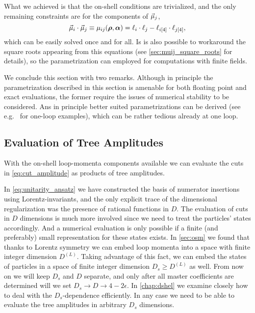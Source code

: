 What we achieved is that the on-shell conditions are trivialized,
and the only remaining constraints are for the components of $\va{\mu}_j$,
\begin{equation}
  \va{\mu}_i \cdot \va{\mu}_j  \equiv  \mu_{ij} (\vb*{\rho},\vb*{\alpha}) = \ell_i\cdot \ell_j - \ell_{i[4]}\cdot \ell_{j[4]},
\end{equation}
which can be easily solved once and for all.
Is is also possible to workaround the square roots appearing from this equations (see \cref{sec:muij_square_roots} for details),
so the parametrization can employed for computations with finite fields.

We conclude this section with two remarks.
Although in principle the parametrization described in this
section is amenable for both floating point and exact evaluations,
the former require the issues of numerical stability to be considered.
Ans in principle better suited parametrizations can be derived (see e.g.\ \cite{Kilgore:2007qr,Berger:2008sj} for one-loop examples),
which can be rather tedious already at one loop.

\subsection{Evaluation of Tree Amplitudes}
\label{sec:evaluation_of_tree_amplitudes}

With the on-shell loop-momenta components available
we can evaluate the cuts in \cref{eq:cut_amplitude} as products
of tree amplitudes.

In \cref{eq:unitarity_ansatz} we have constructed  the basis of numerator insertions using Lorentz-invariants, and
the only explicit trace of the dimensional regularization was the presence of rational functions in $D$.
The evaluation of cuts in $D$ dimensions is much more involved since we need to treat the particles' states accordingly.
And a numerical evaluation is only possible if a finite (and preferably) small representation for these states exists.
In \cref{sec:osm} we found that thanks to Lorentz symmetry we can embed loop
momenta into a space with finite integer dimension $D^{(L)}$.
Taking advantage of this fact, we can embed the states of particles in a space of finite integer dimension $D_s\geq D^{(L)}$ as well.
From now on we will keep $D_s$ and $D$ separate,
and only after all master coefficients are determined will we set $D_s\to D\to 4-2\epsilon$.
In \cref{chap:dshel} we examine closely how to deal with the $D_s$-dependence efficiently.
In any case we need to be able to evaluate the tree amplitudes in arbitrary $D_s$ dimensions.

